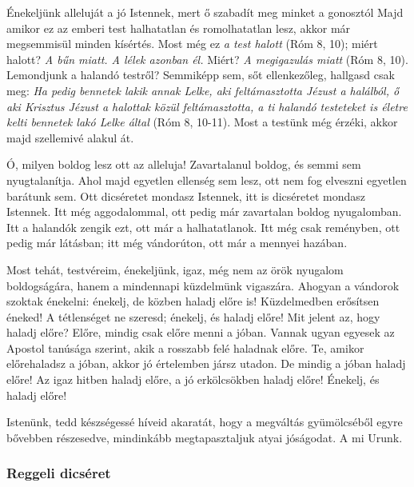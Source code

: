 \documentclass[twoside]{article}
\begin{document}
\begin{lectio}{Énekeljünk alleluját a jó Istennek, mert ő szabadít meg minket a gonosztól}
Majd amikor ez az emberi test halhatatlan és romolhatatlan lesz, akkor már megsemmisül minden kísértés. Most még ez \textit{a test halott} (Róm 8, 10); miért halott? \textit{A bűn miatt. A lélek azonban él.} Miért? \textit{A megigazulás miatt} (Róm 8, 10). Lemondjunk a halandó testről? Semmiképp sem, sőt ellenkezőleg, hallgasd csak meg: \textit{Ha pedig bennetek lakik annak Lelke, aki feltámasztotta Jézust a halálból, ő aki Krisztus Jézust a halottak közül feltámasztotta, a ti halandó testeteket is életre kelti bennetek lakó Lelke által} (Róm 8, 10-11). Most a testünk még érzéki, akkor majd szellemivé alakul át.

Ó, milyen boldog lesz ott az alleluja! Zavartalanul boldog, és semmi sem nyugtalanítja. Ahol majd egyetlen ellenség sem lesz, ott nem fog elveszni egyetlen barátunk sem. Ott dicséretet mondasz Istennek, itt is dicséretet mondasz Istennek. Itt még aggodalommal, ott pedig már zavartalan boldog nyugalomban. Itt a halandók zengik ezt, ott már a halhatatlanok. Itt még csak reményben, ott pedig már látásban; itt még vándorúton, ott már a mennyei hazában.

Most tehát, testvéreim, énekeljünk, igaz, még nem az örök nyugalom boldogságára, hanem a mindennapi küzdelmünk vigaszára. Ahogyan a vándorok szoktak énekelni: énekelj, de közben haladj előre is! Küzdelmedben erősítsen éneked! A tétlenséget ne szeresd; énekelj, és haladj előre! Mit jelent az, hogy haladj előre? Előre, mindig csak előre menni a jóban. Vannak ugyan egyesek az Apostol tanúsága szerint, akik a rosszabb felé haladnak előre. Te, amikor előrehaladsz a jóban, akkor jó értelemben jársz utadon. De mindig a jóban haladj előre! Az igaz hitben haladj előre, a jó erkölcsökben haladj előre! Énekelj, és haladj előre!
\end{lectio}


Istenünk, tedd készségessé híveid akaratát, hogy a megváltás gyümölcséből egyre bővebben részesedve, mindinkább megtapasztaljuk atyai jóságodat. A mi Urunk.

\subsubsection*{Reggeli dicséret}
\end{document}
